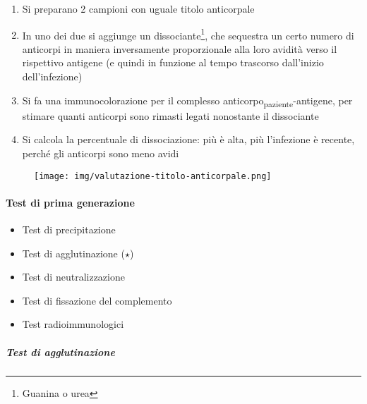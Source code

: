 \documentclass[italian,]{article}
\providecommand{\tightlist}{%
  \setlength{\itemsep}{0pt}\setlength{\parskip}{0pt}}
\newcommand{\normalbox}[2]{\begin{tcolorbox}[title=#1]#2\end{tcolorbox}} %
\begin{document}
{\begin{itemize}
  \begin{enumerate}
  \def\labelenumi{\arabic{enumi}.}
  \tightlist
  \item
    Si preparano 2 campioni con uguale titolo anticorpale
  \item
    In uno dei due si aggiunge un dissociante\footnote{Guanina o urea}, che sequestra un certo
    numero di anticorpi in maniera inversamente proporzionale alla loro avidità verso il rispettivo antigene (e quindi in
    funzione al tempo trascorso dall'inizio dell'infezione)
  \item
    Si fa una immunocolorazione per il complesso
    anticorpo\textsubscript{paziente}-antigene, per stimare quanti
    anticorpi sono rimasti legati nonostante il dissociante
  \item
    Si calcola la percentuale di dissociazione: più è alta, più
    l'infezione è recente, perché gli anticorpi sono meno avidi
  \end{enumerate}
\end{itemize}
}

\normalbox{Valutazione del titolo anticorpale}{
\begin{figure}[H]
\centering
\texttt{[image: img/valutazione-titolo-anticorpale.png]}
\end{figure}
}

\hypertarget{test-di-prima-generazione}{%
\paragraph{Test di prima generazione}\label{test-di-prima-generazione}}

\begin{itemize}
\tightlist
\item
  Test di precipitazione
\item
  Test di agglutinazione (\(\star\))
\item
  Test di neutralizzazione
\item
  Test di fissazione del complemento
\item
  Test radioimmunologici
\end{itemize}

\hypertarget{test-di-agglutinazione}{%
\subparagraph{Test di agglutinazione}\label{test-di-agglutinazione}}
\end{document}
